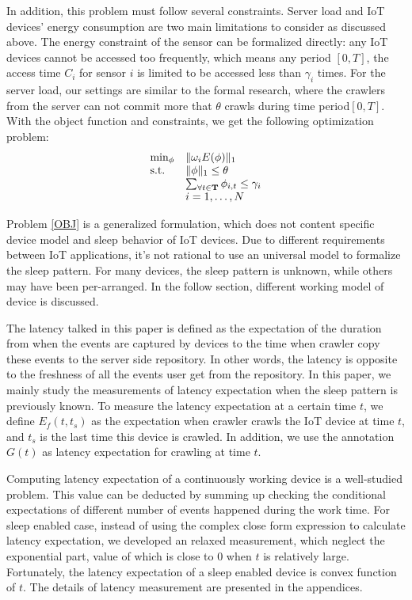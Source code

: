 \documentclass[conference]{IEEEtran}
\begin{document}
In addition, this problem must follow several constraints. Server load and IoT devices' energy consumption are two main limitations to consider as discussed above. 
The energy constraint of the sensor can be formalized directly: any IoT devices cannot be accessed too frequently, which means any period $[0, T]$, the access time $C_i$ for sensor $i$ is limited to be accessed less than $\gamma_i$ times. For the server load, our settings are similar to the formal research\cite{Wolf2002}, where the crawlers from the server can not commit more that $\theta$ crawls during time period$[0, T]$.
With the object function and constraints, we get the following optimization problem:
\begin{eqnarray}
\begin{array}{ll}
\min_{\phi}&\Arrowvert \omega_i E(\phi) \Arrowvert_{1}\\
\text{s.t.}
&\Arrowvert \phi \Arrowvert_{1}\leq\theta\\
&\sum_{\forall t \in \mathbf{T}}{\phi_{i,t}}\leq\gamma_i\\
&i=1,\ldots,N
\end{array}\label{OBJ}
\end{eqnarray}

Problem \eqref{OBJ} is a generalized formulation, which does not content specific device model and sleep behavior of IoT devices. Due to different requirements between IoT applications, it's not rational to use an universal model to formalize the sleep pattern. For many devices, the sleep pattern is unknown, while others may have been per-arranged.  In the follow section, different working model of device is discussed. 

The latency talked in this paper is defined as the expectation of the duration from when the events are captured by devices to the time when crawler copy these events to the server side repository. In other words, the latency is opposite to the freshness of all the events user get from the repository.
In this paper, we mainly study the measurements of latency expectation when the sleep pattern is previously known.
To measure the latency expectation at a certain time $t$, we define $E_f(t, t_s)$ as the expectation when crawler crawls the IoT device at time $t$, and $t_s$ is the last time this device is crawled. In addition, we use the annotation $G(t)$ as latency expectation for crawling at time $t$.

Computing latency expectation of a continuously working device is a well-studied problem\cite{Cho2000, Wolf2002}. 
This value can be deducted by summing up checking the conditional expectations of different number of events happened during the work time. 
For sleep enabled case, instead of using the complex close form expression to calculate latency expectation, we developed an relaxed measurement, which neglect the exponential part, value of which is close to $0$ when $t$ is relatively large. Fortunately, the latency expectation of a sleep enabled device is convex function of $t$.
The details of latency measurement are presented in the appendices. 
\end{document}
